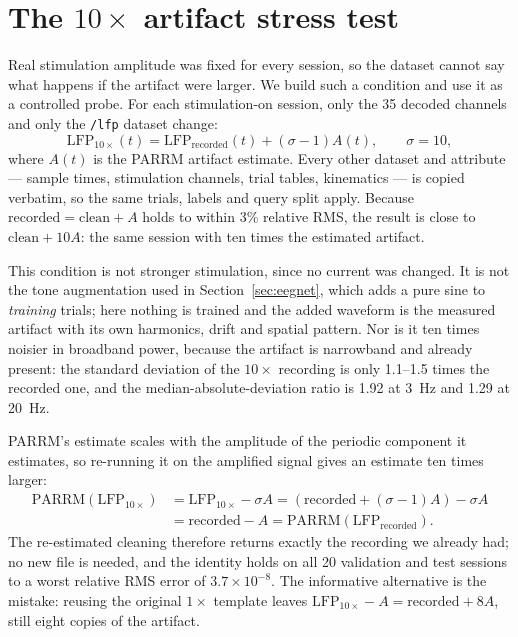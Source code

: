 \documentclass[11pt]{article}
\begin{document}
\section{\texorpdfstring{The $10\times$ artifact stress test}{The 10x artifact stress test}}
\label{app:tenx}

Real stimulation amplitude was fixed for every session, so the dataset cannot say what happens
if the artifact were larger. We build such a condition and use it as a controlled probe. For
each stimulation-on session, only the 35 decoded channels and only the \texttt{/lfp} dataset
change:
\begin{equation}
\mathrm{LFP}_{10\times}(t)=\mathrm{LFP}_{\mathrm{recorded}}(t)+(\sigma-1)A(t),
\qquad \sigma=10,
\end{equation}
where $A(t)$ is the PARRM artifact estimate. Every other dataset and attribute --- sample
times, stimulation channels, trial tables, kinematics --- is copied verbatim, so the same
trials, labels and query split apply. Because $\mathrm{recorded}=\mathrm{clean}+A$ holds to
within 3\% relative RMS, the result is close to $\mathrm{clean}+10A$: the same session with ten
times the estimated artifact.

This condition is not stronger stimulation, since no current was changed. It is not the tone
augmentation used in Section~\ref{sec:eegnet}, which adds a pure sine to \emph{training}
trials; here nothing is trained and the added waveform is the measured artifact with its own
harmonics, drift and spatial pattern. Nor is it ten times noisier in broadband power, because
the artifact is narrowband and already present: the standard deviation of the $10\times$
recording is only 1.1--1.5 times the recorded one, and the median-absolute-deviation ratio is
1.92 at 3~Hz and 1.29 at 20~Hz.

PARRM's estimate scales with the amplitude of the periodic component it estimates, so
re-running it on the amplified signal gives an estimate ten times larger:
\begin{align*}
\mathrm{PARRM}\left(\mathrm{LFP}_{10\times}\right)
&= \mathrm{LFP}_{10\times}-\sigma A
 = \left(\mathrm{recorded}+(\sigma-1)A\right)-\sigma A \\
&= \mathrm{recorded}-A
 = \mathrm{PARRM}\left(\mathrm{LFP}_{\mathrm{recorded}}\right).
\end{align*}
The re-estimated cleaning therefore returns exactly the recording we already had; no new file
is needed, and the identity holds on all 20 validation and test sessions to a worst relative
RMS error of $3.7\times10^{-8}$. The informative alternative is the mistake: reusing the
original $1\times$ template leaves $\mathrm{LFP}_{10\times}-A=\mathrm{recorded}+8A$, still
eight copies of the artifact.
\end{document}
